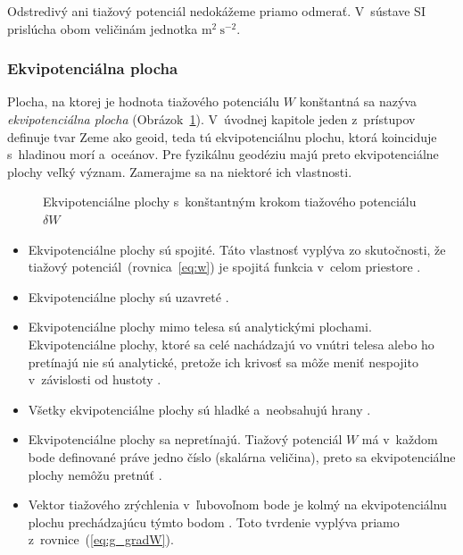 \documentclass[a4paper,12pt]{book}
\begin{document}
Odstredivý ani tiažový potenciál nedokážeme priamo odmerať.  V~sústave SI 
prislúcha obom veličinám jednotka $\mathrm{m}^2 \ \mathrm{s}^{-2}$.

\subsubsection{Ekvipotenciálna plocha}
\label{sec:equipotential_surface}

Plocha, na ktorej je hodnota tiažového potenciálu $W$ konštantná sa nazýva
\emph{ekvipotenciálna plocha} (Obrázok~\ref{fig:equipotential_surfaces}).
V~úvodnej kapitole jeden z~prístupov definuje tvar Zeme ako geoid, teda tú
ekvipotenciálnu plochu, ktorá koinciduje s~hladinou morí a~oceánov.  Pre
fyzikálnu geodéziu majú preto ekvipotenciálne plochy veľký význam.  Zamerajme
sa na niektoré ich vlastnosti.

\begin{figure}
\centering

\caption{Ekvipotenciálne plochy s~konštantným krokom tiažového potenciálu
$\delta W$}
\label{fig:equipotential_surfaces}
\end{figure}

\begin{itemize}
\item Ekvipotenciálne plochy sú spojité.  Táto vlastnosť vyplýva zo
skutočnosti, že tiažový potenciál~(rovnica~\ref{eq:w}) je spojitá funkcia 
v~celom priestore \parencite{Janak2006}.

\item Ekvipotenciálne plochy sú uzavreté \parencite{VanicekGeodesy}.

\item Ekvipotenciálne plochy mimo telesa sú analytickými plochami.
Ekvipotenciálne plochy, ktoré sa celé nachádzajú vo vnútri telesa alebo ho
pretínajú nie sú analytické, pretože ich krivosť sa môže meniť nespojito
v~závislosti od hustoty \parencite{MoritzPhysicalGeodesy}.

\item Všetky ekvipotenciálne plochy sú hladké a~neobsahujú hrany
\parencite{MoritzPhysicalGeodesy}.

\item Ekvipotenciálne plochy sa nepretínajú.  Tiažový potenciál $W$ má v~každom
bode definované práve jedno číslo (skalárna veličina), preto sa ekvipotenciálne
plochy nemôžu pretnúť \parencite{MacMillan1930}.

\item Vektor tiažového zrýchlenia v~ľubovoľnom bode je kolmý na ekvipotenciálnu
plochu prechádzajúcu týmto bodom \parencite{MoritzPhysicalGeodesy}.  Toto 
tvrdenie vyplýva priamo z~rovnice~(\ref{eq:g_gradW}).
\end{itemize}
\end{document}
